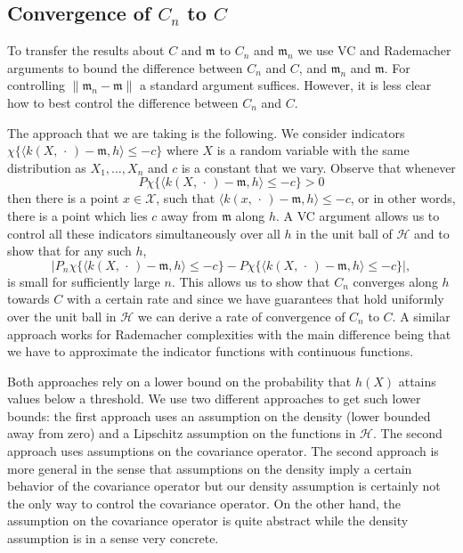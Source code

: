 \documentclass[AHL,Unicode,longabstracts,published]{cedram}
\theoremstyle{remark}
\newcommand{\X}{\mathcal{X}}
\newcommand{\cH}{\mathcal{H}}
\newcommand{\mean}{\mathfrak{m}}
\begin{document}
\subsection{Convergence of \texorpdfstring{$C_n$}{C\_n} to \texorpdfstring{$C$}{C}}

To transfer the results about $C$ and $\mean$ to $C_n$ and $\mean_n$ we use VC and Rademacher arguments to bound the difference between $C_n$ and $C$, and $\mean_n$ and $\mean$. For controlling $\|\mean_n - \mean\|$ a standard argument suffices. However, it is less clear how to best control the difference between $C_n$ and $C$.


The approach that we are taking is the following. We consider indicators\linebreak ${\chi \{\langle k(X,\,\cdot\,) - \mean, h \rangle \leq -c \}}$ where $X$ is a random variable with the same distribution as $X_1,\dots, X_n$ and $c$ is a constant that we vary. Observe that whenever
\[
P \chi\{ \langle k(X,\,\cdot\,) - \mean, h \rangle \leq -c \} > 0
\]
then there is a point $x\in \X$, such that $\langle k(x,\,\cdot\,) - \mean, h \rangle \leq -c$, or in other words, there is a point which lies $c$ away from $\mean$ along $h$. A VC argument allows us to control all these indicators simultaneously over all $h$ in the unit ball of $\cH$ and to show that for any such $h$,
\[
\bigl|P_n \chi\{ \langle k(X,\,\cdot\,) - \mean, h \rangle \leq -c \} - P \chi\{ \langle k(X,\,\cdot\,) - \mean, h \rangle \leq -c \}\bigr|,
\]
is small for sufficiently large $n$. This allows us to show that $C_n$ converges along $h$ towards $C$ with a certain rate and since we have guarantees that hold uniformly over the unit ball in $\cH$ we can derive a rate of convergence of $C_n$ to $C$. A similar approach works for Rademacher complexities with the main difference being that we have to approximate the indicator functions with continuous functions.

Both approaches rely on a lower bound on the probability that $h(X)$ attains values below a threshold. We use two different approaches to get such lower bounds: the first approach uses an assumption on the density (lower bounded away from zero) and a Lipschitz assumption on the functions in $\cH$. The second approach uses assumptions on the covariance operator. The second approach is more general in the sense that assumptions on the density imply a certain behavior of the covariance operator but our density assumption is certainly not the only way to control the covariance operator. On the other hand, the assumption on the covariance operator is quite abstract while the density assumption is in a sense very concrete.
\end{document}

